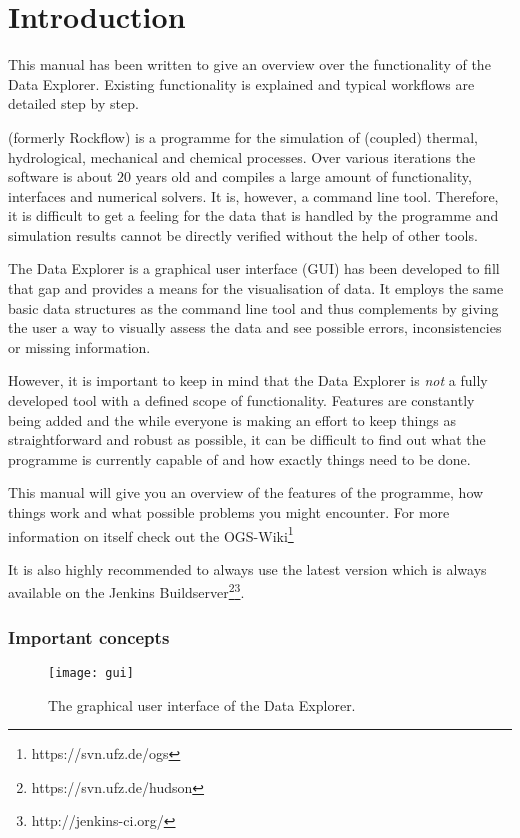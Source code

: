 \chapter{Introduction}

This manual has been written to give an overview over the functionality of the \ogs Data Explorer. Existing functionality is explained and typical workflows are detailed step by step.

\bigskip

\ogs (formerly Rockflow) is a programme for the simulation of (coupled) thermal, hydrological, mechanical and chemical processes. Over various iterations the software is about $20$ years old and compiles a large amount of functionality, interfaces and numerical solvers. It is, however, a command line tool. Therefore, it is difficult to get a feeling for the data that is handled by the programme and simulation results cannot be directly verified without the help of other tools.

The \ogs Data Explorer is a graphical user interface (GUI) has been developed to fill that gap and provides a means for the visualisation of data. It employs the same basic data structures as the command line tool and thus complements \ogs by giving the user a way to visually assess the data and see possible errors, inconsistencies or missing information.

However, it is important to keep in mind that the \ogs Data Explorer is \emph{not} a fully developed tool with a defined scope of functionality. Features are constantly being added and the while everyone is making an effort to keep things as straightforward and robust as possible, it can be difficult to find out what the programme is currently capable of and how exactly things need to be done.

This manual will give you an overview of the features of the programme, how things work and what possible problems you might encounter. For more information on \ogs itself check out the OGS-Wiki\footnote{https://svn.ufz.de/ogs}

It is also highly recommended to always use the latest version which is always available on the Jenkins Buildserver\footnote{https://svn.ufz.de/hudson}\footnote{http://jenkins-ci.org/}.

\subsection*{Important concepts}

\begin{figure}[tb]
\begin{center}
\texttt{[image: gui]}
\caption{The graphical user interface of the \ogs Data Explorer.}
\label{fig:gui}
\end{center}
\end{figure}

